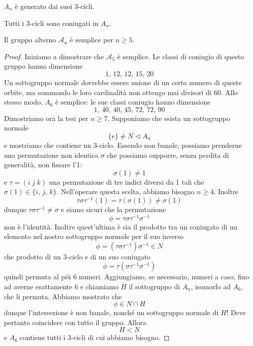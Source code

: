 \begin{multicols}{2}
\begin{remark}
	$ A_n $ è generato dai suoi 3-cicli.
\end{remark}
\begin{remark}
	Tutti i 3-cicli sono coniugati in $ A_n $.
\end{remark}
\begin{theorem}
	Il gruppo alterno $ \mathcal{A}_n $ è semplice per $ n \geq 5 $.
\end{theorem}
\begin{proof}
	Iniziamo a dimostrare che $ \mathcal{A}_5 $ è semplice. Le classi di coniugio di questo gruppo hanno dimensione \[1,\, 12,\, 12,\, 15,\, 20\] Un sottogruppo normale dovrebbe essere unione di un certo numero di queste orbite, ma sommando le loro cardinalità non ottengo mai divisori di 60. Allo stesso modo, $ A_6 $ è semplice: le sue classi coniugio hanno dimensione
	\[ 1,\, 40,\, 40,\, 45,\, 72,\, 72,\, 90 \]
	Dimostriamo ora la tesi per $ n \geq 7 $. Supponiamo che esista un sottogruppo normale
	\[ \{e\} \neq N \lhd A_n \]
	e mostriamo che contiene un 3-ciclo. Essendo non banale, possiamo prenderne una permutazione non identica $ \sigma $ che possiamo supporre, senza perdita di generalità, non fissare l'1:
	$$  \sigma(1) \neq 1  $$ 
	e $ \tau = (i\; j\; k) $ una permutazione di tre indici diversi da 1 tali che $ \sigma(1) \in \{i,\, j,\, k\} $. Nell'operare questa scelta, abbiamo bisogno $ n \geq 4 $. Inoltre
	\[ \tau\sigma\tau^{-1}(1) = \tau(\sigma(1)) \neq \sigma(1) \]
	dunque $ \tau\sigma\tau^{-1} \neq \sigma $ e siamo sicuri che la permutazione
	\[ \phi = \tau\sigma\tau^{-1}\sigma^{-1} \]
	non è l'identità. Inoltre quest'ultima è sia il prodotto tra un coniugato di un elemento nel nostro sottogruppo normale per il suo inverso 
	\[ \phi = (\tau\sigma\tau^{-1})\sigma^{-1} \in N  \]
	che prodotto di un 3-ciclo e di un suo coniugato
	\[ \phi = \tau(\sigma\tau^{-1}\sigma^{-1}) \]
	quindi permuta al più $ 6 $ numeri. Aggiungiamo, se necessario, numeri a caso, fino ad averne esattamente 6 e chiamiamo $ H $ il sottogruppo di $ A_n $, isomorfo ad $ A_6 $, che li permuta. Abbiamo mostrato che
	\[ \phi \in N \cap H \]
	dunque l'intersezione è non banale, nonché un sottogruppo normale di $ H $! Deve pertanto coincidere con tutto il gruppo. Allora
	 \[ H < N \] 
	e $ A_6 $ contiene tutti i 3-cicli di cui abbiamo bisogno.
\end{proof}


\end{multicols}
